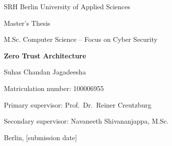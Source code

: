 \begin{titlepage}
\centering
{\large SRH Berlin University of Applied Sciences\par}
\vspace{1cm}
{\large Master's Thesis\par}
{M.Sc. Computer Science -- Focus on Cyber Security\par}
\vspace{2cm}
{\LARGE\bfseries Zero Trust Architecture\par}
\vspace{0.5cm}
{\Large \thesistitle\par}
\vspace{2cm}
{\large Suhas Chandan Jagadeesha\par}
Matriculation number: 100006955\par
\vfill
Primary supervisor: Prof.\ Dr.\ Reiner Creutzburg\par
Secondary supervisor: Navaneeth Shivananjappa, M.Sc.\par
\vspace{1cm}
Berlin, [submission date]\par
\end{titlepage}
